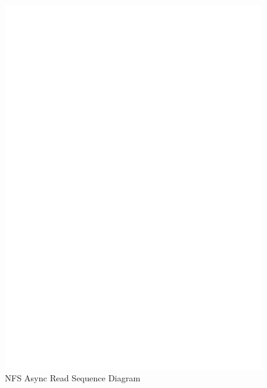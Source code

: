 \begin{figure}
\centering
\includegraphics[scale=0.75]{figures/AsyncSequence.eps}
\caption{NFS Async Read Sequence Diagram}
\label{fig:NFSAsyncRead}
\end{figure}


